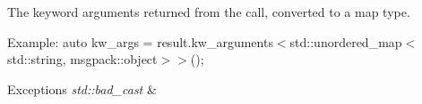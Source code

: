 The keyword arguments returned from the call, converted to a map type. 

Example\+: {\ttfamily auto kw\+\_\+args = result.\+kw\+\_\+arguments$<$std\+::unordered\+\_\+map$<$std\+::string, msgpack\+::object$>$$>$();}


\begin{DoxyExceptions}{Exceptions}
{\em std\+::bad\+\_\+cast} & \\
\hline
\end{DoxyExceptions}
